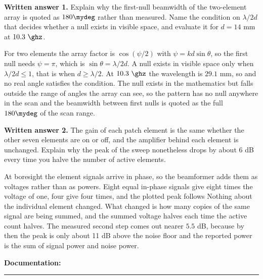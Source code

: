 \documentclass{exam}
\begin{document}
\begin{questions}
\question \textbf{Written answer 1.} Explain why the first-null beamwidth of the
two-element array is quoted as $180\mydeg$ rather than measured. Name the
condition on $\lambda/2d$ that decides whether a null exists in visible space,
and evaluate it for $d = 14$ mm at $10.3\ \ghz$.

\begin{solutionorlines}[2.6in]
For two elements the array factor is $\cos(\psi/2)$ with $\psi = kd\sin\theta$,
so the first null needs $\psi = \pi$, which is $\sin\theta = \lambda/2d$. A null
exists in visible space only when $\lambda/2d \le 1$, that is when
$d \ge \lambda/2$. At $10.3\ \ghz$ the wavelength is $29.1$ mm, so
and no real angle satisfies the condition. The null exists in the mathematics
but falls outside the range of angles the array can see, so the pattern has no
null anywhere in the scan and the beamwidth between first nulls is quoted as the
full $180\mydeg$ of the scan range.
\end{solutionorlines}

\question \textbf{Written answer 2.} The gain of each patch element is the same
whether the other seven elements are on or off, and the amplifier behind each
element is unchanged. Explain why the peak of the sweep nonetheless drops by
about 6 dB every time you halve the number of active elements.

\begin{solutionorlines}[2.4in]
At boresight the element signals arrive in phase, so the beamformer adds them as
voltages rather than as powers. Eight equal in-phase signals give eight times the
voltage of one, four give four times, and the plotted peak follows
Nothing about the individual element changed. What changed is how many copies of
the same signal are being summed, and the summed voltage halves each time the
active count halves. The measured second step comes out nearer $5.5$ dB, because
by then the peak is only about 11 dB above the noise floor and the reported power
is the sum of signal power and noise power.
\end{solutionorlines}

\end{questions}

\vspace{1.0em}
\noindent\textbf{Documentation:} \rule[-2pt]{0.6\linewidth}{0.4pt}
\end{document}

